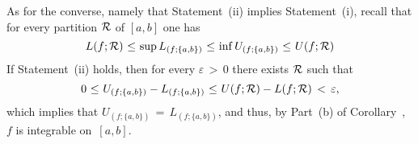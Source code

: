        As for the converse, namely that Statement~(ii) implies Statement~(i), recall that for every partition ${\cal R}$ of $[a,b]$ one has
                \begin{displaymath}
        L(f;{\cal R})\,\,{\leq}\,\,{\sup}\,L_{(f;\{a,b\})}\,\,{\leq}\,\,{\inf}\,U_{(f;\{a,b\})}\,\,{\leq}\,\,U(f;{\cal R})
        \end{displaymath}
    If Statement~(ii) holds, then for every ${\varepsilon}\,>\,0$ there exists ${\cal R}$ such that
        \begin{displaymath}
        0\,\,{\leq}\,\,U_{(f;\{a,b\})} - L_{(f;\{a,b\})}\,\,{\leq}\,\,U(f;{\cal R})-L(f;{\cal R})\,<\,{\varepsilon},
        \end{displaymath}
    which implies that $U_{(f;\{a,b\})} \,=\, L_{(f;\{a,b\})}$, and thus, by Part~(b) of Corollary~, $f$ is integrable on~$[a,b]$.

\VA

